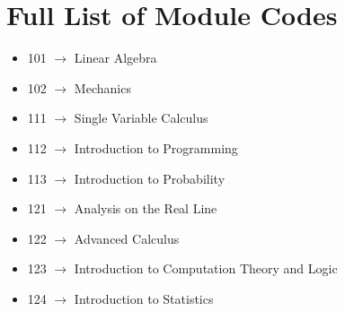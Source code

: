 \documentclass{article}
\begin{document}
\section{\textbf{Full List of Module Codes}}
\begin{itemize}
    \item 101 $\longrightarrow$ Linear Algebra
    \item 102 $\longrightarrow$ Mechanics
    \item 111 $\longrightarrow$ Single Variable Calculus
    \item 112 $\longrightarrow$ Introduction to Programming
    \item 113 $\longrightarrow$ Introduction to Probability
    \item 121 $\longrightarrow$ Analysis on the Real Line
    \item 122 $\longrightarrow$ Advanced Calculus
    \item 123 $\longrightarrow$ Introduction to Computation Theory and Logic
    \item 124 $\longrightarrow$ Introduction to Statistics
\end{itemize} 
\end{document}
